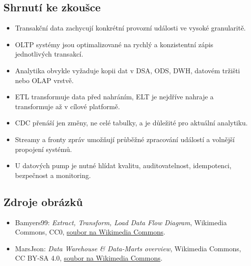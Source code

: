\subsection{Shrnutí ke zkoušce}
\begin{itemize}
  \item Transakční data zachycují konkrétní provozní události ve vysoké granularitě.
  \item OLTP systémy jsou optimalizované na rychlý a konzistentní zápis jednotlivých transakcí.
  \item Analytika obvykle vyžaduje kopii dat v DSA, ODS, DWH, datovém tržišti nebo OLAP vrstvě.
  \item ETL transformuje data před nahráním, ELT je nejdříve nahraje a transformuje až v cílové platformě.
  \item CDC přenáší jen změny, ne celé tabulky, a je důležité pro aktuální analytiku.
  \item Streamy a fronty zpráv umožňují průběžné zpracování událostí a volnější propojení systémů.
  \item U datových pump je nutné hlídat kvalitu, auditovatelnost, idempotenci, bezpečnost a monitoring.
\end{itemize}

\subsection{Zdroje obrázků}
\begin{itemize}
  \item Bamyers99: \textit{Extract, Transform, Load Data Flow Diagram}, Wikimedia Commons, CC0,
  \href{https://commons.wikimedia.org/wiki/File:Extract,_Transform,_Load_Data_Flow_Diagram.svg}{soubor na Wikimedia Commons}.
  \item MarsJson: \textit{Data Warehouse \& Data-Marts overview}, Wikimedia Commons, CC BY-SA 4.0,
  \href{https://commons.wikimedia.org/wiki/File:Data_Warehouse_%26_Data-Marts_overview.svg}{soubor na Wikimedia Commons}.
\end{itemize}

\newpage
